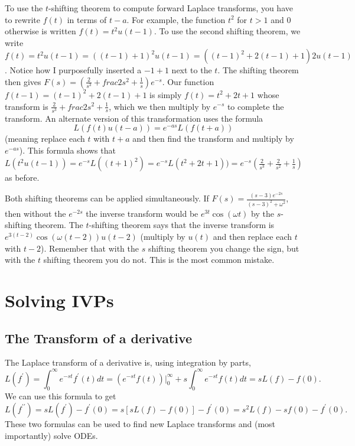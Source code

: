 To use the $t$-shifting theorem to compute forward Laplace transforms, you have to rewrite $f(t)$ in terms of $t-a$. For example, the function $t^2$ for $t>1 $ and 0 otherwise is written $f(t) = t^2 u(t-1)$. To use the second shifting theorem, we write $f(t) = t^2u(t-1) = ( (t-1)+1)^2u(t-1)= ((t-1)^2 +2(t-1)+1)2u(t-1)$. Notice how I purposefully inserted a $-1+1$ next to the $t$. The shifting theorem then gives $F(s)=\left(\frac{2}{s^3}+frac{2}{s^2}+\frac{1}{s}\right)e^{-s}$. Our function $f(t-1) =  (t-1)^2 +2(t-1)+1$ is simply $f(t) = t^2+2t+1$ whose transform is $\frac{2}{s^3}+frac{2}{s^2}+\frac{1}{s}$, which we then multiply by $e^{-s}$ to complete the transform. An alternate version of this transformation uses the formula $$L(f(t)u(t-a)) = e^{-as}L(f(t+a))$$ (meaning replace each $t$ with $t+a$ and then find the transform and multiply by $e^{-as}$).   This formula shows that $L(t^2u(t-1)) = e^{-s}L((t+1)^2) = e^{-s}L(t^2+2t+1)) = e^{-s} \left(\frac{2}{s^3}+\frac{2}{s^2}+\frac{1}{s}\right)$ as before.

Both shifting theorems can be applied simultaneously.  If $F(s) =\frac{(s-3)e^{-2s}}{(s-3)^2+\omega^2} $, then without the $e^{-2s}$ the inverse transform would be $e^{3t}\cos(\omega t)$ by the $s$-shifting theorem. The $t$-shifting theorem says that the inverse transform is $e^{3(t-2)}\cos(\omega(t-2))u(t-2)$ (multiply by $u(t)$ and then replace each $t$ with $t-2$). Remember that with the $s$ shifting theorem you change the sign, but with the $t$ shifting theorem you do not. This is the most common mistake.


\section{Solving IVPs}

\subsection{The Transform of a derivative}
The Laplace transform of a derivative is, using integration by parts, $$L(f^\prime)=\int_0^\infty e^{-st}f^\prime (t)dt = (e^{-st}f(t))\big|_0^\infty + s\int_0^\infty e^{-st}f (t)dt  = sL(f)-f(0).$$  We can use this formula to get $$L(f^{\prime\prime}) = sL(f^\prime)-f^\prime(0) = s[sL(f)-f(0)]-f^\prime(0) = s^2L(f) - sf(0)-f^\prime(0).$$  These two formulas can be used to find new Laplace transforms and (most importantly) solve ODEs.



